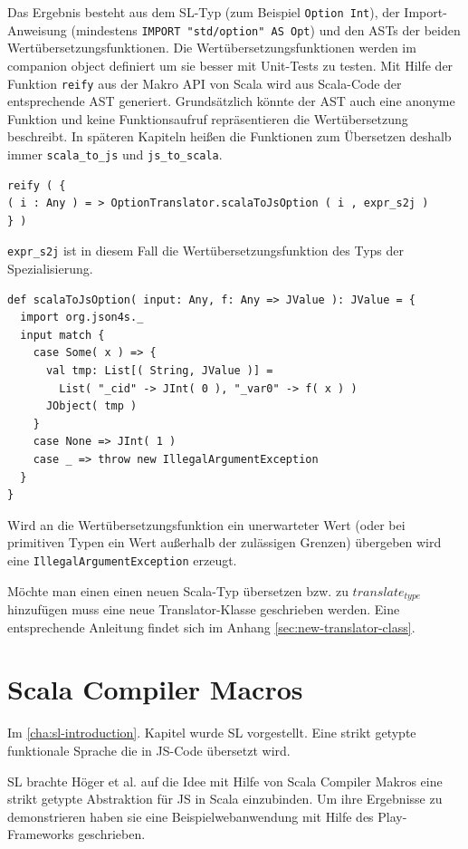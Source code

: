 \documentclass[12pt,bibtotoc]{scrreprt}
\begin{document}
Das Ergebnis besteht aus dem SL-Typ (zum Beispiel \lstinline!Option Int!), der Import-Anweisung (mindestens \lstinline!IMPORT "std/option" AS Opt!) und den ASTs der beiden Wertübersetzungsfunktionen. Die Wertübersetzungsfunktionen werden im companion object definiert um sie besser mit Unit-Tests zu testen. Mit Hilfe der Funktion \lstinline!reify! aus der Makro API von Scala wird aus Scala-Code der entsprechende AST generiert. Grundsätzlich könnte der AST auch eine anonyme Funktion und keine Funktionsaufruf repräsentieren die Wertübersetzung beschreibt. In späteren Kapiteln heißen die Funktionen zum Übersetzen deshalb immer \lstinline!scala_to_js! und \lstinline!js_to_scala!.

\begin{lstlisting}
reify ( {
( i : Any ) = > OptionTranslator.scalaToJsOption ( i , expr_s2j )
} )
\end{lstlisting}

\lstinline!expr_s2j! ist in diesem Fall die Wertübersetzungsfunktion des Typs der Spezialisierung. 

\begin{lstlisting}
def scalaToJsOption( input: Any, f: Any => JValue ): JValue = {
  import org.json4s._
  input match {
    case Some( x ) => {
      val tmp: List[( String, JValue )] = 
        List( "_cid" -> JInt( 0 ), "_var0" -> f( x ) )
      JObject( tmp )
    }
    case None => JInt( 1 )
    case _ => throw new IllegalArgumentException
  }
}
\end{lstlisting}

Wird an die Wertübersetzungsfunktion ein unerwarteter Wert (oder bei primitiven Typen ein Wert außerhalb der zulässigen Grenzen) übergeben wird eine \lstinline!IllegalArgumentException! erzeugt.

Möchte man einen einen neuen Scala-Typ übersetzen bzw. zu $translate_{type}$ hinzufügen muss eine neue Translator-Klasse geschrieben werden. Eine entsprechende Anleitung findet sich im Anhang \ref{sec:new-translator-class}.

\chapter{Scala Compiler Macros}
\label{chap:scala-compiler-macros}

Im \ref{cha:sl-introduction}. Kapitel wurde SL vorgestellt. Eine strikt getypte funktionale Sprache die in JS-Code übersetzt wird.

SL brachte Höger et al. auf die Idee mit Hilfe von Scala Compiler Makros eine strikt getypte Abstraktion für JS in Scala einzubinden\cite{Hoger2013}. Um ihre Ergebnisse zu demonstrieren haben sie eine Beispielwebanwendung mit Hilfe des Play-Frameworks\cite{Play1} geschrieben. 
\end{document}
